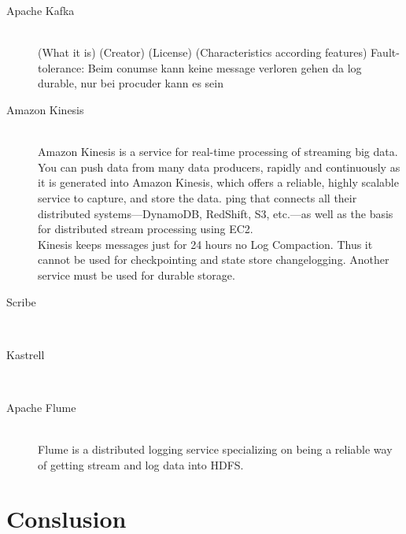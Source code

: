 \begin{description}
    \item [Apache Kafka] \hfill \\
        { (What it is) (Creator) (License) (Characteristics according features) Fault-tolerance: Beim conumse kann keine message verloren gehen da log durable, nur bei procuder kann es sein }
    \item [Amazon Kinesis] \hfill \\
    { Amazon Kinesis is a service for real-time processing of streaming big
    data. You can push data from many data producers, rapidly and continuously
as it is generated into Amazon Kinesis, which offers a reliable, highly
scalable service to capture, and store the data. ping that connects all their
distributed systems—DynamoDB, RedShift, S3, etc.—as well as the basis for
distributed stream processing using EC2. \\
 Kinesis keeps messages just for 24 hours no Log Compaction. Thus it cannot be
 used for checkpointing and state store changelogging. Another service must be
 used for durable storage.\\
    
 }
    \item [Scribe] \hfill \\
    {}
    \item [Kastrell] \hfill \\
    {}
    \item [Apache Flume] \hfill \\
    {Flume is a distributed logging service specializing on being a reliable way of getting stream and log data into HDFS.}
\end{description}

\section{Conslusion}

